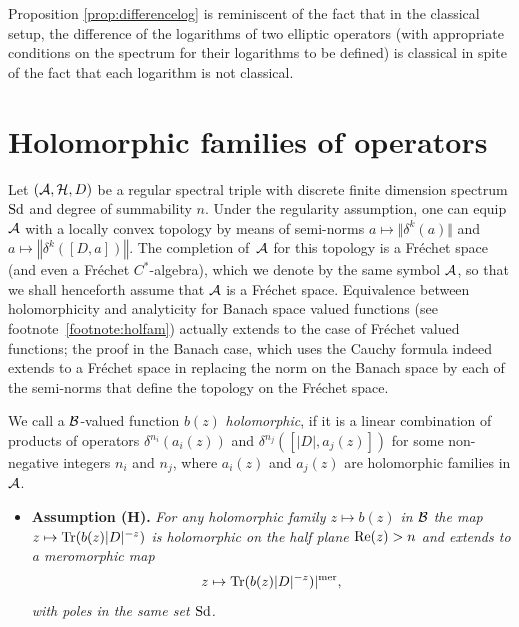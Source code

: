 \begin{remark}
Proposition \ref{prop:differencelog}  is reminiscent of   the  fact that in the classical setup,
  the dif\/ference of the logarithms of two elliptic operators
  (with appropriate conditions on the spectrum for their
   logarithms to be def\/ined) is classical in spite of the fact that each
    logarithm is not classical.\end{remark}


\section{Holomorphic families of operators}\label{section4}

 Let  $\left({\cal A}, {\cal H}, D\right)$ be a regular spectral triple  with
 discrete f\/inite dimension spectrum ${\rm Sd}$ and deg\-ree of summability $n$.
 Under the regularity assumption, one can equip ${\cal A}$ with a locally convex topology by means of semi-norms $a\mapsto \Vert \delta^k(a)\Vert$ and $a\mapsto \left \Vert \delta^k\left( [D, a]\right)\right\Vert$. The completion of~${\cal A}$ for this topology is a  Fr\'echet space~\cite{V} (and even a Fr\'echet $C^*$-algebra), which we denote by the same symbol ${\cal A}$, so that we shall henceforth assume that ${\cal A}$ is a Fr\'echet space.   Equivalence between
 holomorphicity and analyticity for   Banach space valued functions (see footnote~\ref{footnote:holfam})  actually extends to the case of Fr\'echet valued functions; the proof in the Banach case, which uses the Cauchy formula indeed extends to a Fr\'echet space in replacing the norm
  on the Banach space by each of the  semi-norms
  that def\/ine the topology on the Fr\'echet space.

   We call a ${\cal B}$-valued function $b(z)$
{\it holomorphic}, if it is a linear combination of products of  operators
$ \delta^{n_i}(a_i(z))$ and $\delta^{n_j}([\vert D\vert, a_j(z)])$
 for  some non-negative integers $n_i$ and $n_j$, where  $a_i(z)$
 and $a_j(z)$ are holomorphic families in ${\cal A}$.
 \begin{itemize}\itemsep=0pt
\item {\bf Assumption (H).}  {\it For any holomorphic family  $z\mapsto b(z)$ in ${\cal B}$
the  map $ z\mapsto {\rm Tr}(b(z) \vert D\vert^{-z})$
is holomorphic on the  half plane ${\rm Re}(z)>n$ and
 extends to a meromorphic map
 \begin{gather}
 \label{eq:TRz}
  z\mapsto {\rm Tr}(b(z) \vert D\vert^{-z})\vert^{\rm mer},
 \end{gather}
with  poles   in the same  set ${\rm Sd}$.}
\end{itemize}

